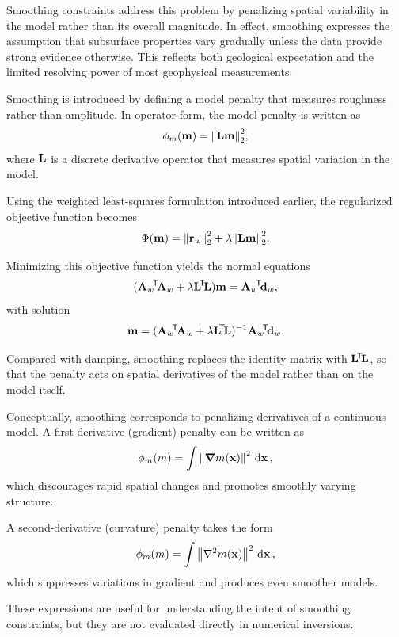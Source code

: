 Smoothing constraints address this problem by penalizing spatial variability in the model rather than its overall magnitude. In effect, smoothing expresses the assumption that subsurface properties vary gradually unless the data provide strong evidence otherwise. This reflects both geological expectation and the limited resolving power of most geophysical measurements.

Smoothing is introduced by defining a model penalty that measures roughness rather than amplitude. In operator form, the model penalty is written as
\[
    \phi_m(\vb{m}) = \norm{\vb{L}\vb{m}}_2^2,
\]
where $\vb{L}$ is a discrete derivative operator that measures spatial variation in the model.

Using the weighted least-squares formulation introduced earlier, the regularized objective function becomes
\begin{equation}
    \Phi(\vb{m}) = \norm{\vb{r}_w}_2^2 + \lambda \norm{\vb{L}\vb{m}}_2^2.
\end{equation}

Minimizing this objective function yields the normal equations
\[
    (\vb{A}_w\!^\mathsf{T}\! \vb{A}_w + \lambda \vb{L}\!^\mathsf{T}\! \vb{L}) \vb{m}
    = \vb{A}_w\!^\mathsf{T}\! \vb{d}_w,
\]
with solution
\begin{equation}
    \vb{m} = (\vb{A}_w\!^\mathsf{T}\! \vb{A}_w + \lambda \vb{L}\!^\mathsf{T}\! \vb{L})^{-1}
    \vb{A}_w\!^\mathsf{T}\! \vb{d}_w.
\end{equation}

Compared with damping, smoothing replaces the identity matrix with $\vb{L}\!^\mathsf{T}\!\vb{L}$, so that the penalty acts on spatial derivatives of the model rather than on the model itself.

Conceptually, smoothing corresponds to penalizing derivatives of a continuous model. A first-derivative (gradient) penalty can be written as
\begin{equation}
    \phi_m(m) = \int \norm{\grad m(\vb{x})}^2 \, \dd{\vb{x}},
\end{equation}
which discourages rapid spatial changes and promotes smoothly varying structure.

A second-derivative (curvature) penalty takes the form
\begin{equation}
    \phi_m(m) = \int \norm{\laplacian m(\vb{x})}^2 \, \dd{\vb{x}},
\end{equation}
which suppresses variations in gradient and produces even smoother models.

These expressions are useful for understanding the intent of smoothing constraints, but they are not evaluated directly in numerical inversions.

